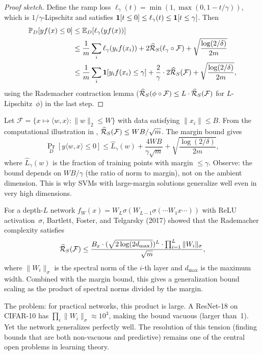 \begin{proof}[Proof sketch]
Define the ramp loss $\ell_\gamma(t) = \min(1, \max(0, 1 - t/\gamma))$,
which is $1/\gamma$-Lipschitz and satisfies
$\mathbf{1}[t \leq 0] \leq \ell_\gamma(t) \leq \mathbf{1}[t \leq \gamma]$.  Then
\begin{align*}
  \mathbb{P}_D[y f(x) \leq 0]
  &\leq \mathbb{E}_D[\ell_\gamma(y f(x))] \\
  &\leq \frac{1}{m}\sum_i \ell_\gamma(y_i f(x_i))
    + 2\widehat{\mathcal{R}}_S(\ell_\gamma \circ \mathcal{F})
    + \sqrt{\frac{\log(2/\delta)}{2m}} \\
  &\leq \frac{1}{m}\sum_i \mathbf{1}[y_i f(x_i) \leq \gamma]
    + \frac{2}{\gamma}\cdot 2\widehat{\mathcal{R}}_S(\mathcal{F})
    + \sqrt{\frac{\log(2/\delta)}{2m}},
\end{align*}
using the Rademacher contraction lemma
($\widehat{\mathcal{R}}_S(\phi \circ \mathcal{F}) \leq L \cdot \widehat{\mathcal{R}}_S(\mathcal{F})$
for $L$-Lipschitz~$\phi$) in the last step.
\end{proof}

\begin{example}
\label{ex:halfspace-margin}
Let $\mathcal{F} = \{x \mapsto \langle w, x \rangle : \|w\|_2 \leq W\}$
with data satisfying $\|x_i\| \leq B$.  From the computational
illustration in ,
$\widehat{\mathcal{R}}_S(\mathcal{F}) \leq WB/\sqrt{m}$.  The margin bound gives
\[
  \Pr_D[y \langle w, x \rangle \leq 0]
  \leq \hat{L}_\gamma(w) + \frac{4WB}{\gamma\sqrt{m}}
    + \sqrt{\frac{\log(2/\delta)}{2m}},
\]
where $\hat{L}_\gamma(w)$ is the fraction of training points with margin
$\leq \gamma$.  Observe: the bound depends on $WB/\gamma$ (the ratio of
norm to margin), not on the ambient dimension.  This is why SVMs with
large-margin solutions generalize well even in very high dimensions.
\end{example}

\begin{example}
\label{ex:neural-margin}
For a depth-$L$ network $f_W(x) = W_L \sigma(W_{L-1} \sigma(\cdots
W_1 x \cdots))$ with ReLU activation~$\sigma$, Bartlett, Foster, and
Telgarsky (2017) showed that the Rademacher complexity satisfies
\[
  \widehat{\mathcal{R}}_S(\mathcal{F})
  \leq \frac{B_x \cdot (\sqrt{2\log(2d_{\max})})^L
    \cdot \prod_{i=1}^L \|W_i\|_\sigma}{\sqrt{m}},
\]
where $\|W_i\|_\sigma$ is the spectral norm of the $i$-th layer and
$d_{\max}$ is the maximum width.  Combined with the margin bound, this
gives a generalization bound scaling as the product of spectral norms
divided by the margin.

The problem: for practical networks, this product is large.  A ResNet-18
on CIFAR-10 has $\prod_i \|W_i\|_\sigma \approx 10^3$, making the bound
vacuous (larger than~1).  Yet the network generalizes perfectly well.  The
resolution of this tension (finding bounds that are both non-vacuous and
predictive) remains one of the central open problems in learning theory.
\end{example}

